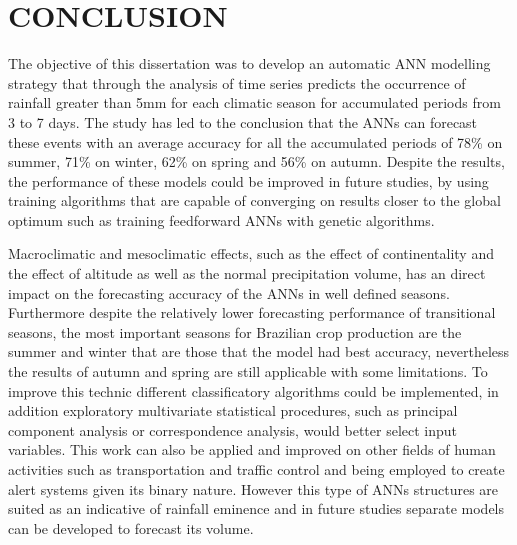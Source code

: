 \chapter{CONCLUSION}
\label{cap:cap4}
\vspace{-2cm}

The objective of this dissertation was to develop an automatic ANN modelling strategy that through the analysis of time series predicts the occurrence of rainfall greater than 5mm for each climatic season for accumulated periods from 3 to 7 days. The study has led to the conclusion that the ANNs can forecast these events with an average accuracy for all the accumulated periods of 78\%  on summer,  71\% on winter, 62\% on spring  and 56\% on autumn. Despite the results, the performance of these models could be improved in future studies, by using training algorithms that are capable of converging on results closer to the global optimum such as training feedforward ANNs with genetic algorithms.

Macroclimatic and mesoclimatic effects, such as the effect of continentality and the effect of altitude as well as the normal precipitation volume, has an direct impact on the forecasting accuracy of the ANNs in well defined seasons. Furthermore despite the relatively lower forecasting performance of transitional seasons, the most important seasons for Brazilian crop production are the summer and winter that are those that the model had best accuracy, nevertheless the results of autumn and spring are still applicable with some limitations. To improve this technic different classificatory algorithms could be implemented, in addition exploratory multivariate statistical procedures, such as principal component analysis or correspondence analysis, would better select input variables. This work can also be applied and improved on other fields of human activities such as transportation and traffic control and being employed to create alert systems given its binary nature. However this type of ANNs structures are suited as an indicative of rainfall eminence and in future studies separate models can be developed to forecast its volume. 
